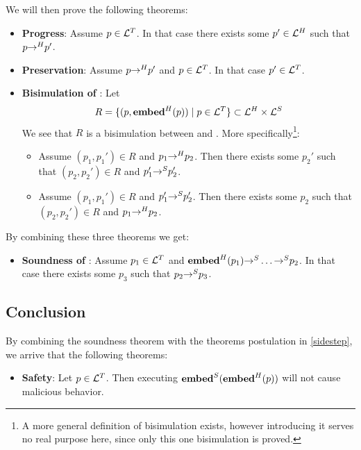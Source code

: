 We will then prove the following theorems:

\begin{itemize}
\item \textbf{Progress}: Assume $p \in {\ensuremath{{{\mathcal{L}}}^T}}$. In that case there exists
  some $p' \in {\ensuremath{{{\mathcal{L}}}^H}}$ such that $p {{->}^H} p'$.
\item \textbf{Preservation}: Assume $p {{->}^H} p'$ and $p \in {\ensuremath{{{\mathcal{L}}}^T}}$. In that
  case $p' \in {\ensuremath{{{\mathcal{L}}}^T}}$.
\item \textbf{Bisimulation of \high\embed}: Let
  $$R = \{(p, {{{\mathbf{embed}}}^H}(p)) \mid p \in {\ensuremath{{{\mathcal{L}}}^T}}\} \subset {\ensuremath{{{\mathcal{L}}}^H}} \times
  {\ensuremath{{{\mathcal{L}}}^S}}$$ We see that $R$ is a bisimulation between \high{->} and
  \simple{->}. More specifically\footnote{A more general definition of
    bisimulation exists, however introducing it serves no real purpose here,
    since only this one bisimulation is proved.}:
  \begin{itemize}
  \item Assume $(p_1, p_1') \in R$ and $p_1 {{->}^H} p_2$. Then there exists
    some $p_2'$ such that $(p_2, p_2') \in R$ and $p_1' {{->}^S} p_2'$.
  \item Assume $(p_1, p_1') \in R$ and $p_1' {{->}^S} p_2'$. Then there
    exists some $p_2$ such that $(p_2, p_2') \in R$ and
    $p_1 {{->}^H} p_2$.
  \end{itemize}
\end{itemize}

By combining these three theorems we get:

\begin{itemize}
\item \textbf{Soundness of \simple\lang}: Assume $p_1 \in {\ensuremath{{{\mathcal{L}}}^T}}$ and
  ${{{\mathbf{embed}}}^H}(p_1) {{->}^S} \dots {\ensuremath{{->}^S}} p_2$. In that case there
  exists some $p_3$ such that $p_2 {{->}^S} p_3$.
\end{itemize}

\subsection{Conclusion}

By combining the soundness theorem with the theorems postulation in
\autoref{sidestep}, we arrive that the following theorems:

\begin{itemize}
\item \textbf{Safety}: Let $p \in {\ensuremath{{{\mathcal{L}}}^T}}$. Then executing
  ${{{\mathbf{embed}}}^S}({{{\mathbf{embed}}}^H}(p))$ will not cause malicious behavior.
\end{itemize}
